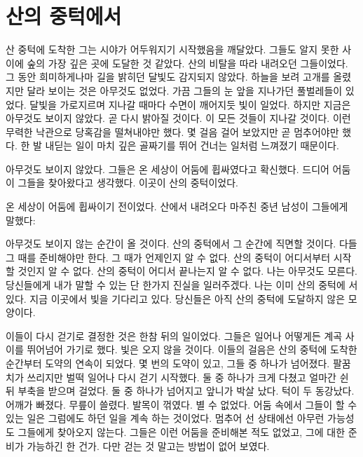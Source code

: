 \hypertarget{uxc0b0uxc758-uxc911uxd131uxc5d0uxc11c}{%

\chapter{산의 중턱에서}\label{uxc0b0uxc758-uxc911uxd131uxc5d0uxc11c}}



산 중턱에 도착한 그는 시야가 어두워지기 시작했음을 깨달았다. 그들도 알지 못한 사이에 숲의 가장 깊은 곳에 도달한 것 같았다. 산의 비탈을 따라 내려오던 그들이었다. 그 동안 희미하게나마 길을 밝히던 달빛도 감지되지 않았다. 하늘을 보려 고개를 올렸지만 달라 보이는 것은 아무것도 없었다. 가끔 그들의 눈 앞을 지나가던 풀벌레들이 있었다. 달빛을 가로지르며 지나갈 때마다 수면이 깨어지듯 빛이 일었다. 하지만 지금은 아무것도 보이지 않았다. 곧 다시 밝아질 것이다. 이 모든 것들이 지나갈 것이다. 이런 무력한 낙관으로 당혹감을 떨쳐내야만 했다. 몇 걸음 걸어 보았지만 곧 멈추어야만 했다. 한 발 내딛는 일이 마치 깊은 골짜기를 뛰어 건너는 일처럼 느껴졌기 때문이다.



아무것도 보이지 않았다. 그들은 온 세상이 어둠에 휩싸였다고 확신했다. 드디어 어둠이 그들을 찾아왔다고 생각했다. 이곳이 산의 중턱이었다.



온 세상이 어둠에 휩싸이기 전이었다. 산에서 내려오다 마주친 중년 남성이 그들에게 말했다:



아무것도 보이지 않는 순간이 올 것이다. 산의 중턱에서 그 순간에 직면할 것이다. 다들 그 때를 준비해야만 한다. 그 때가 언제인지 알 수 없다. 산의 중턱이 어디서부터 시작할 것인지 알 수 없다. 산의 중턱이 어디서 끝나는지 알 수 없다. 나는 아무것도 모른다. 당신들에게 내가 말할 수 있는 단 한가지 진실을 일러주겠다. 나는 이미 산의 중턱에 서 있다. 지금 이곳에서 빛을 기다리고 있다. 당신들은 아직 산의 중턱에 도달하지 않은 모양이다.



이들이 다시 걷기로 결정한 것은 한참 뒤의 일이었다. 그들은 일어나 어떻게든 계곡 사이를 뛰어넘어 가기로 했다. 빛은 오지 않을 것이다. 이들의 걸음은 산의 중턱에 도착한 순간부터 도약의 연속이 되었다. 몇 번의 도약이 있고, 그들 중 하나가 넘어졌다. 팔꿈치가 쓰리지만 벌떡 일어나 다시 걷기 시작했다. 둘 중 하나가 크게 다쳤고 얼마간 쉰 뒤 부축을 받으며 걸었다. 둘 중 하나가 넘어지고 앞니가 박살 났다. 턱이 두 동강났다. 어깨가 빠졌다. 무릎이 쓸렸다. 발목이 꺾였다. 별 수 없었다. 어둠 속에서 그들이 할 수 있는 일은 그럼에도 하던 일을 계속 하는 것이었다. 멈추어 선 상태에선 아무런 가능성도 그들에게 찾아오지 않는다. 그들은 이런 어둠을 준비해본 적도 없었고, 그에 대한 준비가 가능하긴 한 건가. 다만 걷는 것 말고는 방법이 없어 보였다.



